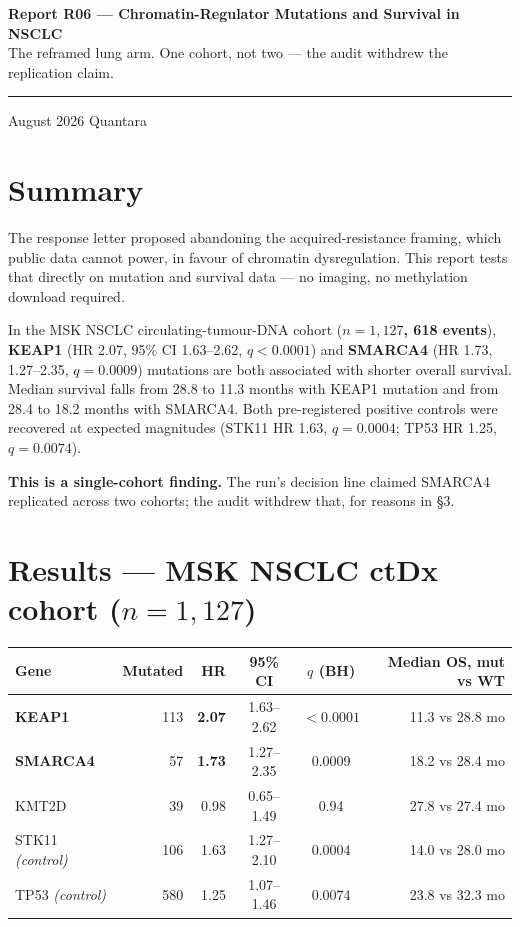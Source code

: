 \documentclass[11pt,a4paper]{article}
\begin{document}
\thispagestyle{empty}
\noindent
{\large\bfseries\color{qnavy} Report R06 --- Chromatin-Regulator Mutations and Survival in NSCLC}\\[2pt]
{\color{qgrey}The reframed lung arm. One cohort, not two --- the audit withdrew the replication claim.}\\[6pt]
{\color{qgrey}\rule{\textwidth}{0.4pt}}

\medskip
{} August 2026 \quad\textbullet\quad Quantara

\section*{Summary}

The response letter proposed abandoning the acquired-resistance framing, which public data
cannot power, in favour of chromatin dysregulation. This report tests that directly on
mutation and survival data --- no imaging, no methylation download required.

In the MSK NSCLC circulating-tumour-DNA cohort (\textbf{$n=1{,}127$, 618 events}),
\textbf{KEAP1} (HR 2.07, 95\% CI 1.63--2.62, $q<0.0001$) and \textbf{SMARCA4} (HR 1.73,
1.27--2.35, $q=0.0009$) mutations are both associated with shorter overall survival. Median
survival falls from 28.8 to 11.3 months with KEAP1 mutation and from 28.4 to 18.2 months with
SMARCA4. Both pre-registered positive controls were recovered at expected magnitudes
(STK11 HR 1.63, $q=0.0004$; TP53 HR 1.25, $q=0.0074$).

\textbf{This is a single-cohort finding.} The run's decision line claimed SMARCA4 replicated
across two cohorts; the audit withdrew that, for reasons in \S3.

\section{Results --- MSK NSCLC ctDx cohort ($n=1{,}127$)}

\begin{center}
\begin{tabular}{@{}lrrccr@{}}
\toprule
\textbf{Gene} & \textbf{Mutated} & \textbf{HR} & \textbf{95\% CI} & \textbf{$q$ (BH)} &
\textbf{Median OS, mut vs WT} \\
\midrule
\textbf{KEAP1} & 113 & \textbf{2.07} & 1.63--2.62 & $<0.0001$ & 11.3 vs 28.8 mo \\
\textbf{SMARCA4} & 57 & \textbf{1.73} & 1.27--2.35 & 0.0009 & 18.2 vs 28.4 mo \\
KMT2D & 39 & 0.98 & 0.65--1.49 & 0.94 & 27.8 vs 27.4 mo \\
\midrule
STK11 \emph{(control)} & 106 & 1.63 & 1.27--2.10 & 0.0004 & 14.0 vs 28.0 mo \\
TP53 \emph{(control)} & 580 & 1.25 & 1.07--1.46 & 0.0074 & 23.8 vs 32.3 mo \\
\bottomrule
\end{tabular}
\end{center}
\end{document}
